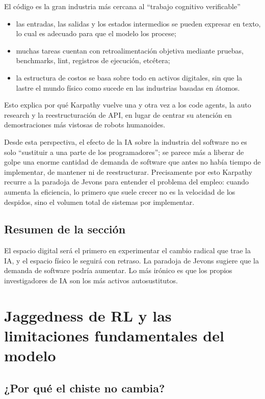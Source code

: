 \documentclass[a4paper]{article}
\begin{document}
\begin{importantbox}{El código es la gran industria más cercana al ``trabajo cognitivo verificable''}
\begin{itemize}
    \item las entradas, las salidas y los estados intermedios se pueden expresar en texto, lo cual es adecuado para que el modelo los procese;
    \item muchas tareas cuentan con retroalimentación objetiva mediante pruebas, benchmarks, lint, registros de ejecución, etcétera;
    \item la estructura de costos se basa sobre todo en activos digitales, sin que la lastre el mundo físico como sucede en las industrias basadas en átomos.
\end{itemize}
Esto explica por qué Karpathy vuelve una y otra vez a los code agents, la auto research y la reestructuración de API, en lugar de centrar su atención en demostraciones más vistosas de robots humanoides.
\end{importantbox}

Desde esta perspectiva, el efecto de la IA sobre la industria del software no es solo ``sustituir a una parte de los programadores''; se parece más a liberar de golpe una enorme cantidad de demanda de software que antes no había tiempo de implementar, de mantener ni de reestructurar. Precisamente por esto Karpathy recurre a la paradoja de Jevons para entender el problema del empleo: cuando aumenta la eficiencia, lo primero que suele crecer no es la velocidad de los despidos, sino el volumen total de sistemas por implementar.

\subsection{Resumen de la sección}

El espacio digital será el primero en experimentar el cambio radical que trae la IA, y el espacio físico le seguirá con retraso. La paradoja de Jevons sugiere que la demanda de software podría aumentar. Lo más irónico es que los propios investigadores de IA son los más activos autosustitutos.
\section{Jaggedness de RL y las limitaciones fundamentales del modelo}

\subsection{¿Por qué el chiste no cambia?}
\end{document}
